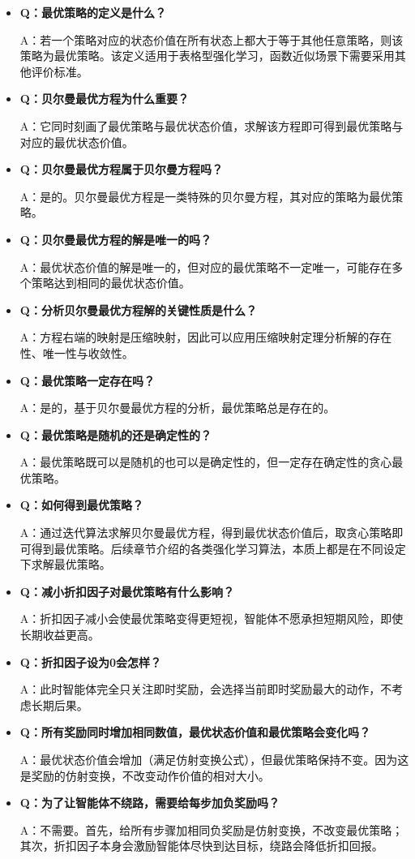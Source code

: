 \documentclass[UTF8]{article}
\begin{document}
\begin{itemize}
    \item \textbf{Q：最优策略的定义是什么？}
    
    A：若一个策略对应的状态价值在所有状态上都大于等于其他任意策略，则该策略为最优策略。该定义适用于表格型强化学习，函数近似场景下需要采用其他评价标准。

    \item \textbf{Q：贝尔曼最优方程为什么重要？}
    
    A：它同时刻画了最优策略与最优状态价值，求解该方程即可得到最优策略与对应的最优状态价值。

    \item \textbf{Q：贝尔曼最优方程属于贝尔曼方程吗？}
    
    A：是的。贝尔曼最优方程是一类特殊的贝尔曼方程，其对应的策略为最优策略。

    \item \textbf{Q：贝尔曼最优方程的解是唯一的吗？}
    
    A：最优状态价值的解是唯一的，但对应的最优策略不一定唯一，可能存在多个策略达到相同的最优状态价值。

    \item \textbf{Q：分析贝尔曼最优方程解的关键性质是什么？}
    
    A：方程右端的映射是压缩映射，因此可以应用压缩映射定理分析解的存在性、唯一性与收敛性。

    \item \textbf{Q：最优策略一定存在吗？}
    
    A：是的，基于贝尔曼最优方程的分析，最优策略总是存在的。

    \item \textbf{Q：最优策略是随机的还是确定性的？}
    
    A：最优策略既可以是随机的也可以是确定性的，但一定存在确定性的贪心最优策略。

    \item \textbf{Q：如何得到最优策略？}
    
    A：通过迭代算法求解贝尔曼最优方程，得到最优状态价值后，取贪心策略即可得到最优策略。后续章节介绍的各类强化学习算法，本质上都是在不同设定下求解最优策略。

    \item \textbf{Q：减小折扣因子对最优策略有什么影响？}
    
    A：折扣因子减小会使最优策略变得更短视，智能体不愿承担短期风险，即使长期收益更高。

    \item \textbf{Q：折扣因子设为0会怎样？}
    
    A：此时智能体完全只关注即时奖励，会选择当前即时奖励最大的动作，不考虑长期后果。

    \item \textbf{Q：所有奖励同时增加相同数值，最优状态价值和最优策略会变化吗？}
    
    A：最优状态价值会增加（满足仿射变换公式），但最优策略保持不变。因为这是奖励的仿射变换，不改变动作价值的相对大小。

    \item \textbf{Q：为了让智能体不绕路，需要给每步加负奖励吗？}
    
    A：不需要。首先，给所有步骤加相同负奖励是仿射变换，不改变最优策略；其次，折扣因子本身会激励智能体尽快到达目标，绕路会降低折扣回报。
\end{itemize}
\end{document}
